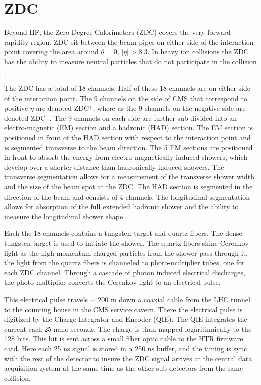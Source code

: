   \section{ZDC \label{sec:zdcDet}} 
    Beyond HF, the Zero Degree Calorimeters (ZDC) covers the very forward 
      rapidity region.
    ZDC sit between the beam pipes on either side of the interaction point 
      covering the area around $\theta = 0$, $|\eta| > 8.3$.
    In heavy ion collisions the ZDC has the ability to measure neutral particles 
    	that do not participate in the collision \cite{tCmsE}.
    
    The ZDC has a total of 18 channels.
        Half of these 18 channels are on either side of the interaction point.
    The 9 channels on the side of CMS that correspond to positive $\eta$
      are denoted ZDC$^{+}$, where as the 9 channels on the negative side are
      denoted ZDC$^{-}$.
    The 9 channels on each side are further sub-divided into an electro-magnetic  
      (EM) section and a hadronic (HAD) section.
    The EM section is positioned in front of the HAD section with respect to the 
      interaction point and is segmented transverse to the beam direction.
    The 5 EM sections are positioned in front to absorb the energy from 
      electro-magnetically induced showers, which develop over a shorter distance 
      than hadronically induced showers.
    The transverse segmentation allows for a measurement of the transverse shower
      width and the size of the beam spot at the ZDC.
    The HAD section is segmented in the direction of the beam and consists of 4
      channels.
    The longitudinal segmentation allows for absorption of the full extended 
      hadronic shower and the ability to measure the longitudinal shower shape.
    
    Each the 18 channels contains a tungsten target and quartz fibers.
    The dense tungsten target is used to initiate the shower.
    The quartz fibers shine Cerenkov light as the high momentum charged particles
      from the shower pass through it. 
    the light from the quartz fibers is channeled to photo-multiplier tubes, one 
      for each ZDC channel. 
    Through a cascade of photon induced electrical discharges, the photo-multiplier
      converts the Cerenkov light to an electrical pulse. 
    
    This electrical pulse travels $\sim$ 200 m down a coaxial cable from the LHC
      tunnel to the counting house in the CMS service cavern. 
    There the electrical pulse is digitized by the Charge Integrator and Encoder 
      (QIE).
    The QIE integrates the current each 25 nano seconds.
    The charge is than mapped logarithmically to the 128 bits. 
    This bit is sent across a small fiber optic cable to the HTR firmware card.
    Here each 25 ns signal is stored in a 250 ns buffer, and the timing is sync
      with the rest of the detector to insure the ZDC signal arrives at the central
      data acquisition system at the same time as the other sub detectors from the 
      same collision. 
    
